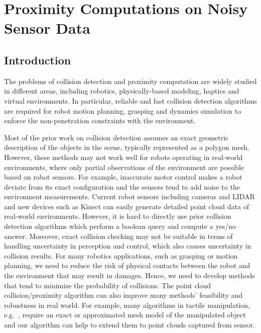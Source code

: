 \chapter{Proximity Computations on Noisy Sensor Data}
\label{chp:PCollide}

\section{Introduction}
The problems of collision detection and proximity computation are widely studied in different areas, including robotics, physically-based modeling, haptics and virtual environments. In particular, reliable and fast collision detection algorithms are required for robot motion planning, grasping and dynamics simulation to enforce the non-penetration constraints with the environment.

Most of the prior work on collision detection assumes an exact geometric description of the objects in the scene, typically represented as a polygon mesh. However, these methods may not work well
for robots operating in real-world environments, where only partial observations of the environment are possible based on robot sensors. For example, inaccurate motor control makes a robot deviate from its
exact configuration and the sensors tend to add noise to the environment measurements.
Current robot sensors including cameras and LIDAR and new devices such as Kinect can easily generate detailed point cloud data of real-world environments. However, it is hard to directly use prior collision detection algorithms which perform a boolean query and compute a yes/no answer.
Moreover, exact collision checking may not be suitable in terms of
handling uncertainty in perception and control, which also causes uncertainty in collision results.
For many robotics applications, such as grasping or motion planning, we need to reduce the risk
of physical contacts between the robot and the environment that may result in damages. Hence, we need to develop methods that tend to minimize the probability of collisions. The point cloud collision/proximity algorithm can also improve many methods' feasibility and robustness in real world. For example, many algorithms in tactile manipulation, e.g.~\cite{anna:2011}, require an exact or approximated mesh model of the manipulated object and our algorithm can help to extend them to point clouds captured from sensor.

